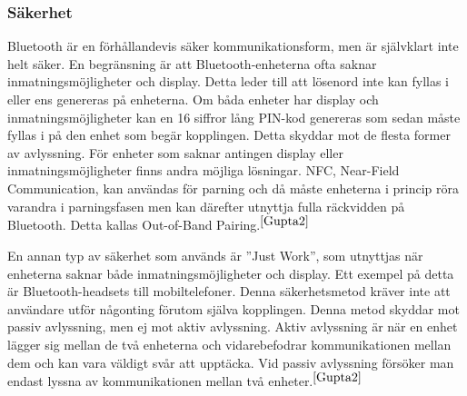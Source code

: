 \documentclass[a4paper,12pt,fleqn]{article}
\begin{document}
\subsubsection{Säkerhet}
Bluetooth är en förhållandevis säker kommunikationsform, men är självklart inte helt säker. En begränsning är att Bluetooth-enheterna ofta saknar inmatningsmöjligheter och display. Detta leder till att lösenord inte kan fyllas i eller ens genereras på enheterna. Om båda enheter har display och inmatningsmöjligheter kan en 16 siffror lång PIN-kod genereras som sedan måste fyllas i på den enhet som begär kopplingen. Detta skyddar mot de flesta former av avlyssning.
För enheter som saknar antingen display eller inmatningsmöjligheter finns andra möjliga lösningar. NFC, Near-Field Communication, kan användas för parning och då måste enheterna i princip röra varandra i parningsfasen men kan därefter utnyttja fulla räckvidden på Bluetooth. Detta kallas Out-of-Band Pairing.$^{\ref{Gupta2}}$

En annan typ av säkerhet som används är ''Just Work'', som utnyttjas när enheterna saknar både inmatningsmöjligheter och display. Ett exempel på detta är Bluetooth-headsets till mobiltelefoner. Denna säkerhetsmetod kräver inte att användare utför någonting förutom själva kopplingen. Denna metod skyddar mot passiv avlyssning, men ej mot aktiv avlyssning. 
Aktiv avlyssning är när en enhet lägger sig mellan de två enheterna och vidarebefodrar kommunikationen mellan dem och kan vara väldigt svår att upptäcka.
Vid passiv avlyssning försöker man endast lyssna av kommunikationen mellan två enheter.$^{\ref{Gupta2}}$
\end{document}

